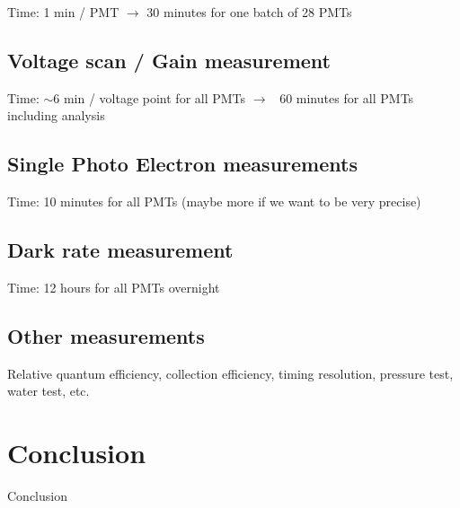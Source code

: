 \documentclass[12pt,a4paper]{article}
\begin{document}
Time: 1 min / PMT $\rightarrow$ 30 minutes for one batch of 28 PMTs

\subsection{Voltage scan / Gain measurement}
Time: $\sim$6 min / voltage point for all PMTs $\rightarrow$ ~60 minutes for all PMTs including analysis

\subsection{Single Photo Electron measurements}

Time: 10 minutes for all PMTs (maybe more if we want to be very precise)

\subsection{Dark rate measurement}

Time: 12 hours for all PMTs overnight

\subsection{Other measurements}
Relative quantum efficiency, collection efficiency, timing resolution, pressure test, water test, etc.

\section{Conclusion}
Conclusion

\FloatBarrier

%
\end{document}
